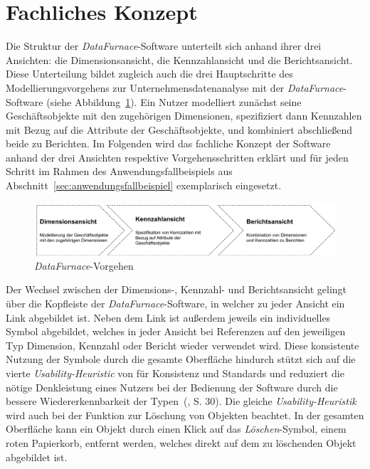 \documentclass[
  language=german, %
  type=bachelor,%
  ngerman
]{isthesis}
\begin{document}
\begin{content}
\begin{enumerate}
  \end{enumerate}



  \section{Fachliches Konzept}\label{sec:software/fachliches-konzept}

  Die Struktur der \textit{DataFurnace}-Software unterteilt sich anhand ihrer
  drei Ansichten: die Dimensionsansicht, die Kennzahlansicht und die
  Berichtsansicht. Diese Unterteilung bildet zugleich auch die drei
  Hauptschritte des Modellierungsvorgehens zur Unternehmensdatenanalyse mit der
  \textit{DataFurnace}-Software (siehe Abbildung~\ref{datafurnace-prozess}).
  Ein Nutzer modelliert zunächst seine Geschäftsobjekte mit den zugehörigen
  Dimensionen, spezifiziert dann Kennzahlen mit Bezug auf die Attribute der
  Geschäftsobjekte, und kombiniert abschließend beide zu Berichten. Im
  Folgenden wird das fachliche Konzept der Software anhand der drei Ansichten
  respektive Vorgehensschritten erklärt und für jeden Schritt im Rahmen des
  Anwendungsfallbeispiels aus Abschnitt~\ref{sec:anwendungsfallbeispiel}
  exemplarisch eingesetzt.

  \begin{figure}
    \includegraphics[scale=0.60]{content/figures/datafurnace-process}
    \caption{\textit{DataFurnace}-Vorgehen}\label{datafurnace-prozess}
  \end{figure}

  Der Wechsel zwischen der Dimensions-, Kennzahl- und Berichtsansicht gelingt
  über die Kopfleiste der \textit{DataFurnace}-Software, in welcher zu jeder
  Ansicht ein Link abgebildet ist. Neben dem Link ist außerdem jeweils ein
  individuelles Symbol abgebildet, welches in jeder Ansicht bei Referenzen auf
  den jeweiligen Typ Dimension, Kennzahl oder Bericht wieder verwendet wird.
  Diese konsistente Nutzung der Symbole durch die gesamte Oberfläche hindurch
  stützt sich auf die vierte \textit{Usability-Heuristic} von
  \textsc{\citeauthor{nielsen1994heuristic}} für Konsistenz und Standards und
  reduziert die nötige Denkleistung eines Nutzers bei der Bedienung der
  Software durch die bessere Wiedererkennbarkeit der
  Typen~(\citeyear{nielsen1994heuristic}, S. 30).  Die gleiche
  \textit{Usability-Heuristik} wird auch bei der Funktion zur Löschung von
  Objekten beachtet. In der gesamten Oberfläche kann ein Objekt durch einen
  Klick auf das \textit{Löschen}-Symbol, einem roten Papierkorb, entfernt
  werden, welches direkt auf dem zu löschenden Objekt abgebildet ist.



\end{content}
\end{document}
